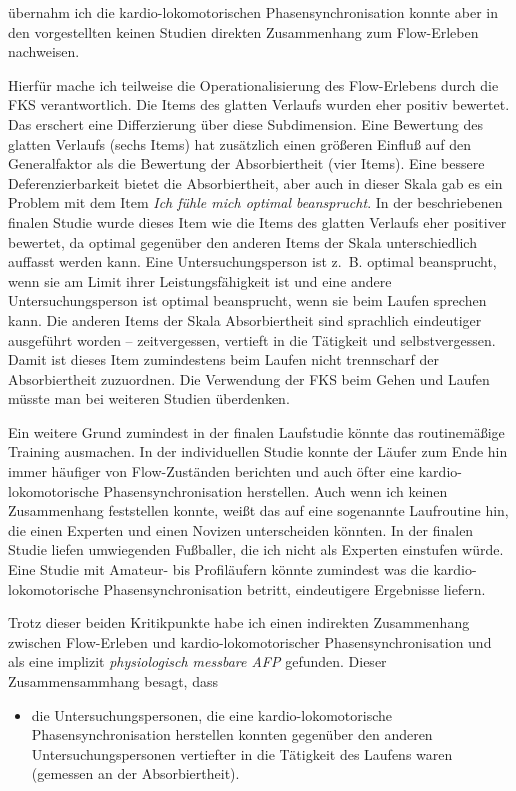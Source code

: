 übernahm ich die kardio-lokomotorischen Phasensynchronisation konnte aber in den vorgestellten keinen Studien direkten Zusammenhang zum Flow-Erleben nachweisen.

Hierfür mache ich teilweise die Operationalisierung des Flow-Erlebens durch die \ac{FKS} verantwortlich. Die Items des glatten Verlaufs wurden eher positiv bewertet. Das erschert eine Differzierung über diese Subdimension. Eine Bewertung des glatten Verlaufs (sechs Items) hat zusätzlich einen größeren Einfluß auf den Generalfaktor als die Bewertung der Absorbiertheit (vier Items). Eine bessere Deferenzierbarkeit bietet die Absorbiertheit, aber auch in dieser Skala gab es ein Problem mit dem Item \emph{Ich fühle mich optimal beansprucht}. In der beschriebenen finalen Studie wurde dieses Item wie die Items des glatten Verlaufs eher positiver bewertet, da optimal gegenüber den anderen Items der Skala unterschiedlich auffasst werden kann. Eine Untersuchungsperson ist z.~B. optimal beansprucht, wenn sie am Limit ihrer Leistungsfähigkeit ist und eine andere Untersuchungsperson ist optimal beansprucht, wenn sie beim Laufen sprechen kann. Die anderen Items der Skala Absorbiertheit sind sprachlich eindeutiger ausgeführt worden -- zeitvergessen, vertieft in die Tätigkeit und selbstvergessen. Damit ist dieses Item zumindestens beim Laufen nicht trennscharf der Absorbiertheit zuzuordnen. Die Verwendung der \ac{FKS} beim Gehen und Laufen müsste man bei weiteren Studien überdenken.

Ein weitere Grund zumindest in der finalen Laufstudie könnte das routinemäßige Training ausmachen. In der individuellen Studie konnte der Läufer zum Ende hin immer häufiger von Flow-Zuständen berichten und auch öfter eine kardio-lokomotorische Phasensynchronisation herstellen. Auch wenn ich keinen Zusammenhang feststellen konnte, weißt das auf eine sogenannte Laufroutine hin, die einen Experten und einen Novizen unterscheiden könnten. In der finalen Studie liefen umwiegenden Fußballer, die ich nicht als Experten einstufen würde. Eine Studie mit Amateur- bis Profiläufern könnte zumindest was die kardio-lokomotorische Phasensynchronisation betritt, eindeutigere Ergebnisse liefern.

Trotz dieser beiden Kritikpunkte habe ich einen indirekten Zusammenhang zwischen Flow-Erleben und kardio-lokomotorischer Phasensynchronisation und als eine implizit \emph{physiologisch messbare \ac{AFP}} gefunden. Dieser Zusammensammhang besagt, dass 
\begin{itemize}
	
	\item die Untersuchungspersonen, die eine kardio-lokomotorische Phasensynchronisation herstellen konnten gegenüber den anderen Untersuchungspersonen vertiefter in die Tätigkeit des Laufens waren (gemessen an der Absorbiertheit).
\end{itemize}

